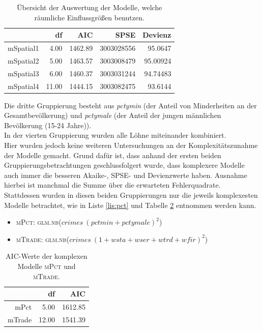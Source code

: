 \begin{table}[ht]
\centering
\begin{tabular}{rrrrr}
  \hline
 & df & AIC & SPSE & Devienz\\ 
  \hline
  mSpatial1 & 4.00 & 1462.89 & 3003028556 & 95.0647\\ 
  mSpatial2 & 5.00 & 1463.57 & 3003008479 & 95.00924\\ 
  mSpatial3 & 6.00 & 1460.37 & 3003031244 & 94.74483\\ 
  mSpatial4 & 11.00 & 1444.15 & 3003082475 & 93.6144\\ 
   \hline
\end{tabular}
\caption[Auswertung r\"aumliche Einflussgr\"o\ss{}en]{\"Ubersicht der Auswertung der Modelle, welche r\"aumliche Einflussgr\"o\ss{}en benutzen.}
\label{tab:spa}
\end{table}

\par\smallskip
Die dritte Gruppierung besteht aus \textit{pctymin} (der Anteil von Minderheiten an der Gesamtbev\"olkerung) und \textit{pctymale} (der Anteil der jungen m\"annlichen Bev\"olkerung (15-24 Jahre)). 
\\
In der vierten Gruppierung wurden alle L\"ohne miteinander kombiniert. \\
Hier wurden jedoch keine weiteren Untersuchungen an der Komplexit\"atszunahme der Modelle gemacht.
Grund daf\"ur ist, dass anhand der ersten beiden Gruppierungsbetrachtungen geschlussfolgert wurde, dass komplexere Modelle auch immer die besseren Akaike-, SPSE- und Devienzwerte haben.
Ausnahme hierbei ist manchmal die Summe \"uber die erwarteten Fehlerquadrate. \\
Stattdessen wurden in diesen beiden Gruppierungen nur die jeweils komplexesten Modelle betrachtet, wie in Liste \ref{lis:pct} und Tabelle \ref{tab:pct} entnommen werden kann.


\begin{itemize}
\item \textsc{mPct: glm.nb($crimes~(pctmin+pctymale)^2$)}
\item \textsc{mTrade: glm.nb($crimes~(1+wsta+wser+wtrd+wfir)^2$)}
\label{lis:pct}
\end{itemize}

\begin{table}[ht]
\centering
\begin{tabular}{rrr}
  \hline
 & df & AIC \\ 
  \hline
mPct & 5.00 & 1612.85 \\ 
  mTrade & 12.00 & 1541.39 \\ 
   \hline
\end{tabular}
\caption{AIC-Werte der komplexen Modelle \textsc{mPct} und \textsc{mTrade}.}
\label{tab:pct}
\end{table}

